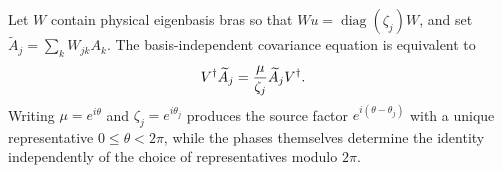 \begin{lemma}
    \label{lem:physical_eigenbasis_intertwining}
    \leanok
    Let $W$ contain physical eigenbasis bras so that
    $Wu=\operatorname{diag}(\zeta_j)W$, and set
    $\widetilde A_j=\sum_k W_{jk}A_k$.
    The basis-independent covariance equation is equivalent to
    \begin{align}
        V^\dagger\widetilde A_j
         & =\frac{\mu}{\zeta_j}\widetilde A_jV^\dagger.
        \notag
    \end{align}
    Writing $\mu=e^{i\theta}$ and $\zeta_j=e^{i\theta_j}$ produces the source
    factor $e^{i(\theta-\theta_j)}$ with a unique representative
    $0\leq\theta<2\pi$, while the phases themselves determine the identity
    independently of the choice of representatives modulo $2\pi$.
\end{lemma}
